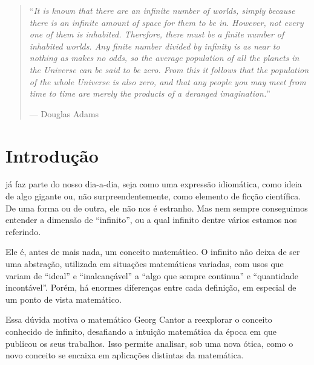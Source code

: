 \documentclass[journal,transmag]{IEEEtran}
\begin{document}
\begin{quotation}
	``\textit{It is known that there are an infinite number of worlds, simply because there is an infinite amount of space for them to be in. However, not every one of them is inhabited. Therefore, there must be a finite number of inhabited worlds. Any finite number divided by infinity is as near to nothing as makes no odds, so the average population of all the planets in the Universe can be said to be zero. From this it follows that the population of the whole Universe is also zero, and that any people you may meet from time to time are merely the products of a deranged imagination.}''
	
	\hfill --- Douglas Adams
\end{quotation}


\section{Introdução}
% 
% 
% 
% 
 já faz parte do nosso dia-a-dia,
seja como uma expressão idiomática, como ideia de algo gigante
ou, não surpreendentemente, como elemento de ficção científica.
De uma forma ou de outra, ele não nos é estranho.
Mas nem sempre conseguimos entender a dimensão de ``infinito'',
ou a qual infinito dentre vários estamos nos referindo.

Ele é, antes de mais nada, um conceito matemático. O infinito
não deixa de ser uma abstração, utilizada em situações matemáticas
variadas, com usos que variam de ``ideal'' e ``inalcançável'' a
``algo que sempre continua'' e ``quantidade incontável''. Porém,
há enormes diferenças entre cada definição, em especial de um ponto
de vista matemático.

Essa dúvida motiva o matemático Georg Cantor a reexplorar o conceito conhecido de infinito,
desafiando a intuição matemática da época em
que publicou os seus trabalhos. Isso permite analisar, sob uma nova
ótica, como o novo conceito se encaixa em aplicações
distintas da matemática.
\end{document}

